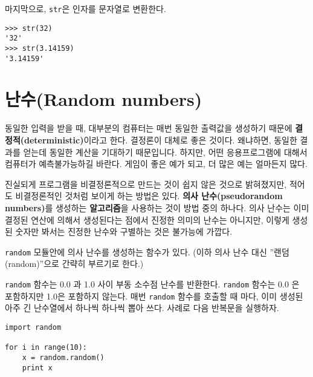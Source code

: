 마지막으로, {\tt str}은 인자를 문자열로 변환한다.


\beforeverb
\begin{verbatim}
>>> str(32)
'32'
>>> str(3.14159)
'3.14159'
\end{verbatim}
\afterverb
%

\section{난수(Random numbers)}


동일한 입력을 받을 때, 대부분의 컴퓨터는 매번 동일한 출력값을 생성하기 때문에 {\bf 결정적(deterministic)}이라고 한다.
결정론이 대체로 좋은 것이다. 왜냐하면, 동일한 결과를 얻는데 동일한 계산을 기대하기 때문입니다. 
하지만, 어떤 응용프로그램에 대해서 컴퓨터가 예측불가능하길 바란다. 
게임이 좋은 예가 되고, 더 많은 예는 얼마든지 많다.

진실되게 프로그램을 비결정론적으로 만드는 것이 쉽지 않은 것으로 밝혀졌지만, 
적어도 비결정론적인 것처럼 보이게 하는 방법은 있다. 
{\bf 의사 난수(pseudorandom numbers)}를 생성하는 {\bf 알고리즘}을 사용하는 것이 방법 중의 하나다. 
의사 난수는 이미 결정된 연산에 의해서 생성된다는 점에서 진정한 의미의 난수는 아니지만, 
이렇게 생성된 숫자만 봐서는 진정한 난수와 구별하는 것은 불가능에 가깝다.


{\tt random} 모듈안에 의사 난수를 생성하는 함수가 있다. 
(이하 의사 난수 대신 ''랜덤(random)''으로 간략히 부르기로 한다.)


{\tt random} 함수는 0.0 과 1.0 사이 부동 소수점 난수를 반환한다. {\tt random} 함수는 0.0 은 포함하지만 1.0은 포함하지 않는다.
매번 {\tt random} 함수를 호출할 때 마다, 이미 생성된 아주 긴 난수열에서 하나씩 하나씩 뽑아 쓰다. 
사례로 다음 반복문을 실행하자.

\beforeverb
\begin{verbatim}
import random

for i in range(10):
    x = random.random()
    print x
\end{verbatim}
\afterverb
%

